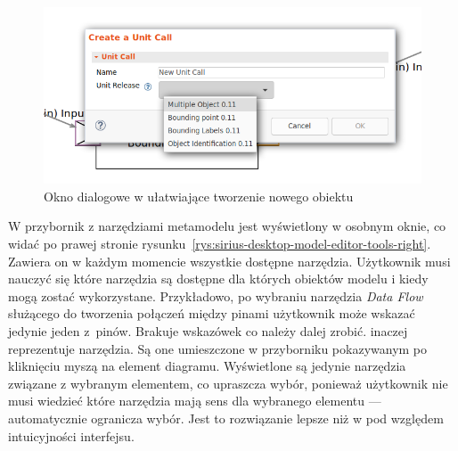 \begin{figure}[!hb]
  \centering

  \includegraphics[width=0.95\linewidth]{./images/sirius-desktop-create-unit-call-dialog.png}
  \caption{Okno dialogowe w \SiriusDesktop{} ułatwiające tworzenie nowego
    obiektu}\label{rys:sirius-desktop-create-unit-call-dialog}
\end{figure}

W \SiriusDesktop{} przybornik z narzędziami metamodelu jest wyświetlony
w osobnym oknie, co widać po prawej stronie
rysunku~\ref{rys:sirius-desktop-model-editor-tools-right}. Zawiera on w każdym
momencie wszystkie dostępne narzędzia.
Użytkownik musi nauczyć się które narzędzia są dostępne dla których obiektów
modelu i kiedy mogą zostać wykorzystane. Przykładowo, po wybraniu narzędzia
\emph{Data Flow} służącego do tworzenia połączeń między pinami użytkownik może
wskazać jedynie jeden z~pinów. Brakuje wskazówek co należy dalej zrobić.
\SiriusWeb{} inaczej reprezentuje narzędzia. Są one umieszczone w
przyborniku pokazywanym po kliknięciu myszą na element diagramu. Wyświetlone są
jedynie narzędzia związane z wybranym elementem, co upraszcza wybór, ponieważ
użytkownik nie musi wiedzieć które narzędzia mają sens dla wybranego elementu
--- \SiriusWeb{} automatycznie ogranicza wybór. Jest to rozwiązanie lepsze
niż w \SiriusDesktop{} pod względem intuicyjności interfejsu.

